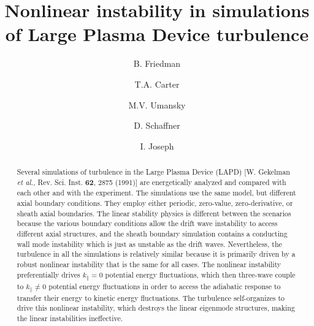 \documentclass[showpacs,preprintnumbers,amsmath,amssymb,superscriptaddress,aip]{revtex4-1}
\begin{document}
\title{Nonlinear instability in simulations of Large Plasma Device turbulence}

\author{B. Friedman}

\author{T.A. Carter}


\author{M.V. Umansky}

\author{D. Schaffner}


\author{I. Joseph}





\begin{abstract}
Several simulations of turbulence in the Large Plasma Device (LAPD) [W. Gekelman \emph{et al.}, Rev. Sci. Inst. {\bf 62}, 2875 (1991)] are energetically analyzed and compared with each other
and with the experiment.
The simulations use the same model, but different axial boundary conditions. They employ either periodic, zero-value, zero-derivative, or sheath axial boundaries. The linear stability physics is
different between the scenarios because the various boundary conditions allow the drift wave instability to access different axial structures, and the sheath boundary simulation
contains a conducting wall mode instability which is just as unstable as the drift waves. Nevertheless, the turbulence in all the simulations is relatively similar because it is primarily
driven by a robust nonlinear instability that is the same for all cases.
The nonlinear instability preferentially drives $k_\parallel = 0$ potential energy fluctuations, which
then three-wave couple to $k_\parallel \ne 0$ potential energy fluctuations in order to access the adiabatic response to transfer their energy to kinetic energy fluctuations.
The turbulence self-organizes to drive this nonlinear instability, which destroys the linear eigenmode structures, making the linear instabilities ineffective. 
\end{abstract}

\maketitle
\end{document}
